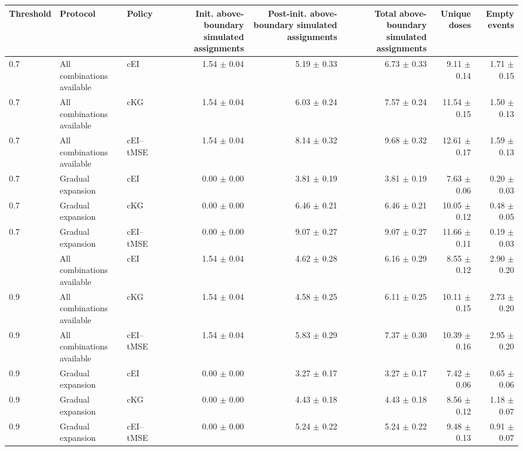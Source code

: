 \begin{tabular}{lllrrrrr}
\toprule
Threshold & Protocol & Policy & Init. above-boundary simulated assignments & Post-init. above-boundary simulated assignments & Total above-boundary simulated assignments & Unique doses & Empty events \\
\midrule
0.7 & All combinations available & cEI & 1.54 $\pm$ 0.04 & 5.19 $\pm$ 0.33 & 6.73 $\pm$ 0.33 & 9.11 $\pm$ 0.14 & 1.71 $\pm$ 0.15 \\
0.7 & All combinations available & cKG & 1.54 $\pm$ 0.04 & 6.03 $\pm$ 0.24 & 7.57 $\pm$ 0.24 & 11.54 $\pm$ 0.15 & 1.50 $\pm$ 0.13 \\
0.7 & All combinations available & cEI--tMSE & 1.54 $\pm$ 0.04 & 8.14 $\pm$ 0.32 & 9.68 $\pm$ 0.32 & 12.61 $\pm$ 0.17 & 1.59 $\pm$ 0.13 \\
0.7 & Gradual expansion & cEI & 0.00 $\pm$ 0.00 & 3.81 $\pm$ 0.19 & 3.81 $\pm$ 0.19 & 7.63 $\pm$ 0.06 & 0.20 $\pm$ 0.03 \\
0.7 & Gradual expansion & cKG & 0.00 $\pm$ 0.00 & 6.46 $\pm$ 0.21 & 6.46 $\pm$ 0.21 & 10.05 $\pm$ 0.12 & 0.48 $\pm$ 0.05 \\
0.7 & Gradual expansion & cEI--tMSE & 0.00 $\pm$ 0.00 & 9.07 $\pm$ 0.27 & 9.07 $\pm$ 0.27 & 11.66 $\pm$ 0.11 & 0.19 $\pm$ 0.03 \\
\addlinespace
0.9 & All combinations available & cEI & 1.54 $\pm$ 0.04 & 4.62 $\pm$ 0.28 & 6.16 $\pm$ 0.29 & 8.55 $\pm$ 0.12 & 2.90 $\pm$ 0.20 \\
0.9 & All combinations available & cKG & 1.54 $\pm$ 0.04 & 4.58 $\pm$ 0.25 & 6.11 $\pm$ 0.25 & 10.11 $\pm$ 0.15 & 2.73 $\pm$ 0.20 \\
0.9 & All combinations available & cEI--tMSE & 1.54 $\pm$ 0.04 & 5.83 $\pm$ 0.29 & 7.37 $\pm$ 0.30 & 10.39 $\pm$ 0.16 & 2.95 $\pm$ 0.20 \\
0.9 & Gradual expansion & cEI & 0.00 $\pm$ 0.00 & 3.27 $\pm$ 0.17 & 3.27 $\pm$ 0.17 & 7.42 $\pm$ 0.06 & 0.65 $\pm$ 0.06 \\
0.9 & Gradual expansion & cKG & 0.00 $\pm$ 0.00 & 4.43 $\pm$ 0.18 & 4.43 $\pm$ 0.18 & 8.56 $\pm$ 0.12 & 1.18 $\pm$ 0.07 \\
0.9 & Gradual expansion & cEI--tMSE & 0.00 $\pm$ 0.00 & 5.24 $\pm$ 0.22 & 5.24 $\pm$ 0.22 & 9.48 $\pm$ 0.13 & 0.91 $\pm$ 0.07 \\
\bottomrule
\end{tabular}
